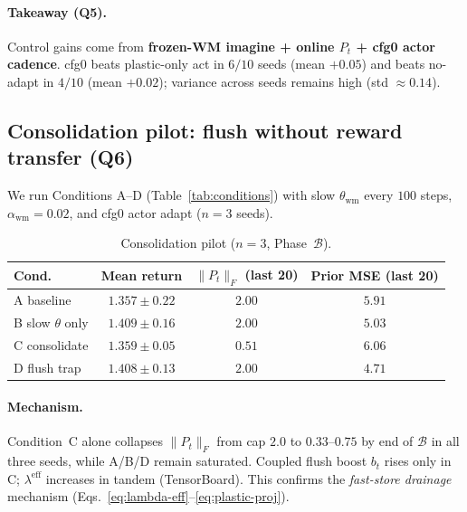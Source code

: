 \paragraph{Takeaway (Q5).}
Control gains come from \textbf{frozen-WM imagine + online $P_t$ + cfg0 actor cadence}.
cfg0 beats plastic-only act in $6/10$ seeds (mean $+0.05$) and beats no-adapt in $4/10$ (mean $+0.02$); variance across seeds remains high (std ${\approx} 0.14$).

\subsection{Consolidation pilot: flush without reward transfer (Q6)}
\label{sec:exp-consolidation}

We run Conditions A--D (Table~\ref{tab:conditions}) with slow $\theta_{\mathrm{wm}}$ every $100$ steps, $\alpha_{\mathrm{wm}}{=}0.02$, and cfg0 actor adapt ($n{=}3$ seeds).

\begin{table}[t]
  \centering
  \caption{Consolidation pilot ($n{=}3$, Phase~$\mathcal{B}$).}
  \label{tab:consolidation}
  \begin{tabular}{@{}lccc@{}}
    \toprule
    Cond. & Mean return & $\|P_t\|_F$ (last 20) & Prior MSE (last 20) \\
    \midrule
    A baseline      & $1.357 \pm 0.22$ & $2.00$ & $5.91$ \\
    B slow $\theta$ only & $\mathbf{1.409 \pm 0.16}$ & $2.00$ & $5.03$ \\
    C consolidate   & $1.359 \pm 0.05$ & $\mathbf{0.51}$ & $6.06$ \\
    D flush trap    & $1.408 \pm 0.13$ & $2.00$ & $4.71$ \\
    \bottomrule
  \end{tabular}
\end{table}

\paragraph{Mechanism.}
Condition~C alone collapses $\|P_t\|_F$ from cap $2.0$ to $0.33$--$0.75$ by end of $\mathcal{B}$ in all three seeds, while A/B/D remain saturated.
Coupled flush boost $b_t$ rises only in C; $\lambda^{\mathrm{eff}}$ increases in tandem (TensorBoard).
This confirms the \emph{fast-store drainage} mechanism (Eqs.~\eqref{eq:lambda-eff}--\eqref{eq:plastic-proj}).

